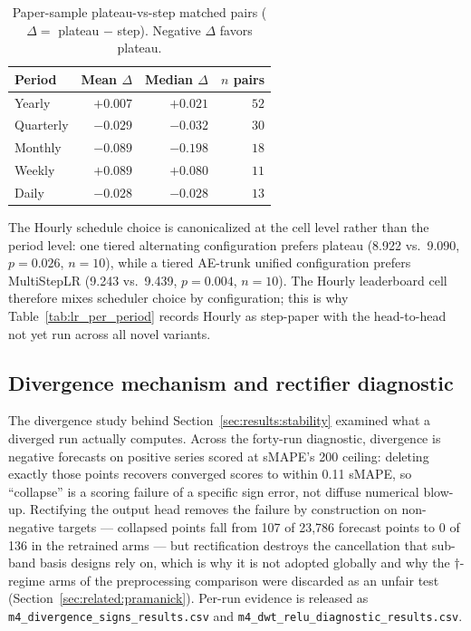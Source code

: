 \begin{table}[h]
\centering
\small
\caption{Paper-sample plateau-vs-step matched pairs
($\Delta =$ plateau $-$ step). Negative $\Delta$ favors plateau.}
\label{tab:lr_matched}
\begin{tabular}{@{}lrrr@{}}
\toprule
Period & Mean $\Delta$ & Median $\Delta$ & $n$ pairs \\
\midrule
Yearly    & $+0.007$ & $+0.021$ & $52$ \\
Quarterly & $\mathbf{-0.029}$ & $-0.032$ & $30$ \\
Monthly   & $\mathbf{-0.089}$ & $-0.198$ & $18$ \\
Weekly    & $+0.089$ & $+0.080$ & $11$ \\
Daily     & $\mathbf{-0.028}$ & $-0.028$ & $13$ \\
\bottomrule
\end{tabular}
\end{table}

The Hourly schedule choice is canonicalized at the cell level rather than
the period level: one tiered alternating configuration prefers plateau
(8.922 vs.\ 9.090, $p = 0.026$, $n = 10$), while a tiered AE-trunk unified
configuration prefers MultiStepLR (9.243 vs.\ 9.439, $p = 0.004$, $n = 10$).
The Hourly leaderboard cell therefore mixes scheduler choice by
configuration; this is why Table~\ref{tab:lr_per_period} records Hourly as
step-paper with the head-to-head not yet run across all novel variants.

\subsection{Divergence mechanism and rectifier diagnostic}
\label{app:ablations:divergence}

The divergence study behind Section~\ref{sec:results:stability} examined
what a diverged run actually computes. Across the forty-run diagnostic,
divergence is negative forecasts on positive series scored at sMAPE's 200
ceiling: deleting exactly those points recovers converged scores to within
0.11 sMAPE, so ``collapse'' is a scoring failure of a specific sign error,
not diffuse numerical blow-up. Rectifying the output head removes the
failure by construction on non-negative targets --- collapsed points fall
from 107 of 23{,}786 forecast points to 0 of 136 in the retrained arms ---
but rectification destroys the cancellation that sub-band basis designs
rely on, which is why it is not adopted globally and why the
$\dagger$-regime arms of the preprocessing comparison were discarded as an
unfair test (Section~\ref{sec:related:pramanick}). Per-run evidence is
released as \texttt{m4\_divergence\_signs\_results.csv} and
\texttt{m4\_dwt\_relu\_diagnostic\_results.csv}.


